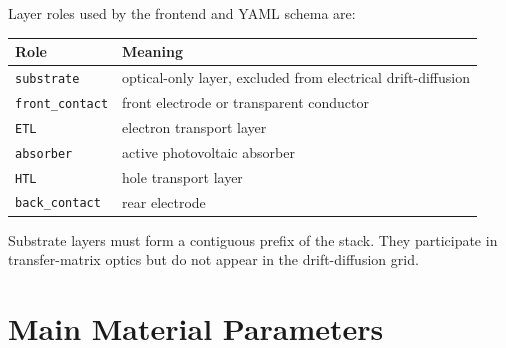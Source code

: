 \documentclass[
  11pt,
  american,
]{report}
\begin{document}
Layer roles used by the frontend and YAML schema are:

\begin{longtable}[]{@{}ll@{}}
\toprule
Role & Meaning \\
\midrule
\endhead
\texttt{substrate} & optical-only layer, excluded from electrical
drift-diffusion \\
\texttt{front\_contact} & front electrode or transparent conductor \\
\texttt{ETL} & electron transport layer \\
\texttt{absorber} & active photovoltaic absorber \\
\texttt{HTL} & hole transport layer \\
\texttt{back\_contact} & rear electrode \\
\bottomrule
\end{longtable}

Substrate layers must form a contiguous prefix of the stack. They
participate in transfer-matrix optics but do not appear in the
drift-diffusion grid.

\hypertarget{main-material-parameters}{%
\section{Main Material Parameters}\label{main-material-parameters}}
\end{document}

